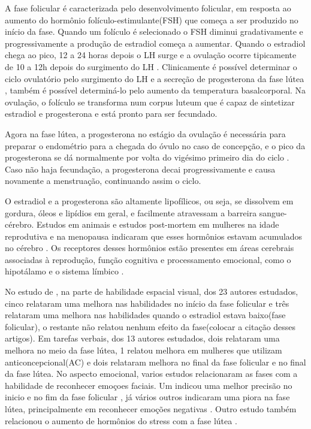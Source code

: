 A fase folicular é caracterizada pelo desenvolvimento folicular, em resposta ao aumento do hormônio folículo-estimulante(FSH) que começa a ser produzido no início da fase. Quando um folículo é selecionado o FSH diminui gradativamente e progressivamente a produção de estradiol começa a aumentar. Quando o estradiol chega ao pico, 12 a 24 horas depois o LH surge e a ovulação ocorre tipicamente de 10 a 12h depois do surgimento do LH \cite{fritz2010}. Clinicamente é possível determinar o ciclo ovulatório pelo surgimento do LH e a secreção de progesterona da fase lútea \cite{fritz2010}, também é possível determiná-lo pelo aumento da temperatura basalcorporal. Na ovulação, o folículo se transforma num corpus luteum que é capaz de sintetizar estradiol e progesterona e está pronto para ser fecundado.

Agora na fase lútea, a progesterona no estágio da ovulação é necessária para preparar o endométrio para a chegada do óvulo no caso de concepção, e o pico da progesterona se dá normalmente por volta do vigésimo primeiro dia do ciclo \cite{nikas2003}. Caso não haja fecundação, a progesterona decai progressivamente e causa novamente a menstruação, continuando assim o ciclo.

O estradiol e a progesterona são altamente lipofílicos, ou seja, se dissolvem em gordura, óleos e lipídios em geral, e facilmente atravessam a barreira sangue-cérebro. Estudos em animais e estudos post-mortem em mulheres na idade reprodutiva e na menopausa indicaram que esses hormônios estavam acumulados no cérebro \cite{bixo1997}. Os receptores desses hormônios estão presentes em áreas cerebrais associadas à reprodução, função cognitiva e processamento emocional, como o hipotálamo e o sistema límbico \cite{gruber2002, brinton2008}.

 No estudo de , na parte de habilidade espacial visual, dos 23 autores estudados, cinco relataram uma melhora nas habilidades no início da fase folicular e três relataram uma melhora nas habilidades quando o estradiol estava baixo(fase folicular), o restante não relatou nenhum efeito da fase(colocar a citação desses artigos). Em tarefas verbais, dos 13 autores estudados, dois relataram uma melhora no meio da fase lútea, 1 relatou melhora em mulheres que utilizam anticoncepcional(AC) e dois relataram melhora no final da fase folicular e no final da fase lútea. No aspecto emocional, varios estudos relacionaram as fases com a habilidade de reconhecer emoçoes faciais. Um indicou uma melhor precisão no inicio e no fim da fase folicular \cite{dernl2013}, já vários outros indicaram uma piora na fase lútea, principalmente em reconhecer emoções negativas \cite{gasbarri2008}. Outro estudo também relacionou o aumento de hormônios do stress com a fase lútea \cite{kirschbaum1999}.

